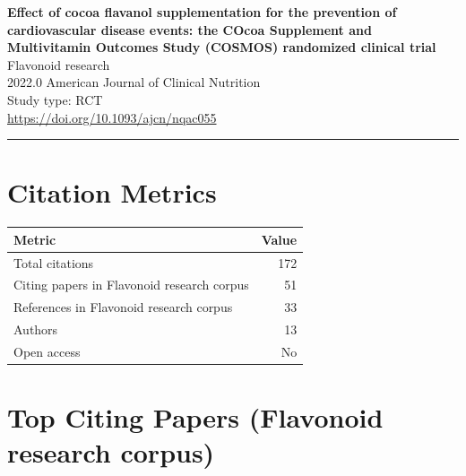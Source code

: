\documentclass[a4paper,11pt]{article}
\begin{document}
\begin{center}
  {\LARGE\bfseries Effect of cocoa flavanol supplementation for the prevention of cardiovascular disease events: the COcoa Supplement and Multivitamin Outcomes Study (COSMOS) randomized clinical trial}\\[0.4em]
  {\large\color{accent} Flavonoid research}\\[0.25em]
  {\normalsize 2022.0 \quad American Journal of Clinical Nutrition}\\[0.15em]
  {\small Study type: RCT}\\[0.1em]
  {\small\url{https://doi.org/10.1093/ajcn/nqac055}}
\end{center}
\vspace{0.4em}\noindent\rule{\linewidth}{0.5pt}\vspace{0.4em}



\section*{Citation Metrics}

\begin{tabular}{lr}
\toprule
Metric & Value \\
\midrule
    Total citations & 172 \\
    Citing papers in Flavonoid research corpus & 51 \\
    References in Flavonoid research corpus & 33 \\
    Authors & 13 \\
    Open access & No \\
\bottomrule
\end{tabular}

\section*{Top Citing Papers (Flavonoid research corpus)}
\end{document}

